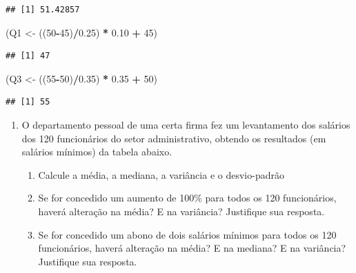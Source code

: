 \documentclass[]{article}
\newenvironment{Shaded}{\begin{snugshade}}{\end{snugshade}}
\newcommand{\DecValTok}[1]{\textcolor[rgb]{0.00,0.00,0.81}{#1}}
\newcommand{\FloatTok}[1]{\textcolor[rgb]{0.00,0.00,0.81}{#1}}
\newcommand{\StringTok}[1]{\textcolor[rgb]{0.31,0.60,0.02}{#1}}
\newcommand{\OperatorTok}[1]{\textcolor[rgb]{0.81,0.36,0.00}{\textbf{#1}}}
\newcommand{\NormalTok}[1]{#1}
\providecommand{\tightlist}{%
  \setlength{\itemsep}{0pt}\setlength{\parskip}{0pt}}
\begin{document}
\begin{verbatim}
## [1] 51.42857
\end{verbatim}

\begin{Shaded}
\begin{Highlighting}[]
\NormalTok{(Q1 <-}\StringTok{ }\NormalTok{((}\DecValTok{50}\OperatorTok{-}\DecValTok{45}\NormalTok{)}\OperatorTok{/}\FloatTok{0.25}\NormalTok{) }\OperatorTok{*}\StringTok{ }\FloatTok{0.10} \OperatorTok{+}\StringTok{ }\DecValTok{45}\NormalTok{)}
\end{Highlighting}
\end{Shaded}

\begin{verbatim}
## [1] 47
\end{verbatim}

\begin{Shaded}
\begin{Highlighting}[]
\NormalTok{(Q3 <-}\StringTok{ }\NormalTok{((}\DecValTok{55}\OperatorTok{-}\DecValTok{50}\NormalTok{)}\OperatorTok{/}\FloatTok{0.35}\NormalTok{) }\OperatorTok{*}\StringTok{ }\FloatTok{0.35} \OperatorTok{+}\StringTok{ }\DecValTok{50}\NormalTok{)}
\end{Highlighting}
\end{Shaded}

\begin{verbatim}
## [1] 55
\end{verbatim}

\begin{enumerate}
\def\labelenumi{\arabic{enumi}.}
\setcounter{enumi}{5}
\tightlist
\item
  O departamento pessoal de uma certa firma fez um levantamento dos
  salários dos 120 funcionários do setor administrativo, obtendo os
  resultados (em salários mínimos) da tabela abaixo.

  \begin{enumerate}
  \def\labelenumii{(\alph{enumii})}
  \tightlist
  \item
    Calcule a média, a mediana, a variância e o desvio-padrão
  \item
    Se for concedido um aumento de 100\% para todos os 120 funcionários,
    haverá alteração na média? E na variância? Justifique sua resposta.
  \item
    Se for concedido um abono de dois salários mínimos para todos os 120
    funcionários, haverá alteração na média? E na mediana? E na
    variância? Justifique sua resposta.
  \end{enumerate}
\end{enumerate}
\end{document}
